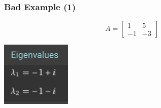 \documentclass{beamer}
\begin{document}
\begin{frame}
	\frametitle{Bad Example (1)}
	\begin{equation*}
		A=\begin{bmatrix}
			1 & 5 \\
			-1 & -3
		\end{bmatrix}
	\end{equation*}
	\begin{center}
		\includegraphics[width=0.25\textwidth]{eigenvalues2.png}
	\end{center}
	\vspace{-\abovedisplayskip}
\end{frame}
\end{document}
